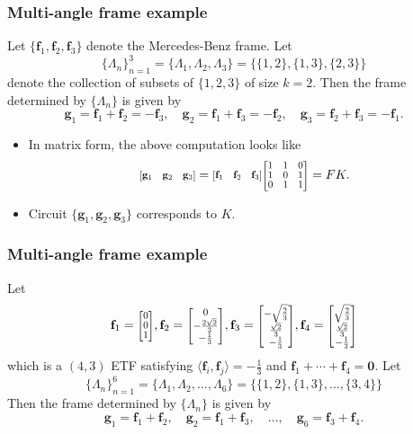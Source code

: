 \documentclass{beamer}
\renewcommand{\vec}[1]{\mathbf{#1}}
\newcommand{\ivec}[2][.8]{%
  \scalebox{#1}{%
    \renewcommand{\arraystretch}{.8}%
    $\begin{bmatrix}#2\end{bmatrix}$%
  }
}
\begin{document}
{\begin{frame}
    \frametitle{Multi-angle frame example}
    \begin{example}
        Let $\{\vec{f}_1, \vec{f}_2, \vec{f}_3\}$ denote the Mercedes-Benz frame.
        Let
        \[
        \{\Lambda_n\}_{n=1}^{3} = \{\Lambda_1, \Lambda_2, \Lambda_3\} = \{\{1, 2\}, \{1, 3\}, \{2, 3\}\}
        \]
        denote the collection of subsets of $\{1,2,3\}$ of size $k = 2$.
        Then the frame determined by $\{\Lambda_n\}$ is given by
        \[
        \vec{g}_1 = \vec{f}_1+\vec{f}_2 = -\vec{f}_3,\quad \vec{g}_2 = \vec{f}_1+\vec{f}_3 = -\vec{f}_2,\quad \vec{g}_3 = \vec{f}_2+\vec{f}_3 = -\vec{f}_1.
        \]
    \end{example}
    \begin{itemize}
    \item <2-> In matrix form, the above computation looks like
    \[
    \ivec{\vec{g}_1 & \vec{g}_2 & \vec{g}_3}
    = \ivec{\vec{f}_1 & \vec{f}_2 & \vec{f}_3}\ivec{1 & 1 & 0 \\ 1 & 0 & 1 \\ 0 & 1 & 1} = FK.
    \]
    \item <3-> Circuit $\{\vec{g}_1,\vec{g}_2,\vec{g}_3\}$ corresponds to $K$.
    \end{itemize}
\end{frame}

\begin{frame}
    \frametitle{Multi-angle frame example}
    \begin{example}
        Let
        \[
            \vec{f}_1 = \ivec{0\\0\\1}, \vec{f}_2 = \ivec{0\\-\frac{2\sqrt{2}}{3} \\ -\frac{1}{3}}, \vec{f}_3 = \ivec{-\sqrt{\frac{2}{3}} \\ \frac{\sqrt{2}}{3} \\ -\frac{1}{3}}, \vec{f}_4 = \ivec{\sqrt{\frac{2}{3}} \\ \frac{\sqrt{2}}{3} \\ -\frac{1}{3}}
        \]
        which is a $(4,3)$ ETF satisfying $\langle\vec{f}_i,\vec{f}_j\rangle = -\frac{1}{3}$ and $\vec{f}_1 + \cdots + \vec{f}_4 = \vec{0}$.
        Let
        \[
        \{\Lambda_n\}_{n=1}^{6} = \{\Lambda_1, \Lambda_2, \ldots, \Lambda_6\} = \{\{1, 2\}, \{1, 3\}, \ldots, \{3, 4\}\}
        \]
        Then the frame determined by $\{\Lambda_n\}$ is given by
        \[
        \vec{g}_1 = \vec{f}_1+\vec{f}_2,\quad \vec{g}_2 = \vec{f}_1+\vec{f}_3, \quad \ldots, \quad \vec{g}_6 = \vec{f}_3+\vec{f}_4.
        \]
    \end{example}
\end{frame}

}
\end{document}

